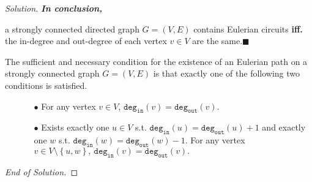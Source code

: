 \documentclass{article}
\renewcommand{\qedsymbol}{\hfill $\blacksquare$\par}
\newenvironment{solution}{\begin{proof}[\noindent\it Solution]}{\end{proof}}
\begin{document}
\begin{solution}
    \vspace{2em}\hspace{-2em}
    \textbf{\textit{In conclusion,}}
    
    \hspace{0.6em}
    a strongly connected directed graph $G=(V,E)$ contains Eulerian circuits \textbf{iff.} the in-degree and out-degree of each vertex $v\in V$ are the same.\qedsymbol
    
    \vspace{3em} \hspace{0.5em}
    The sufficient and necessary condition for the existence of an Eulerian path on a strongly connected graph $G=(V,E)$ is that exactly one of the following two conditions is satisfied.

    \vspace{-0.5em}
    \begin{itemize}
        \item[] \begin{itemize}
            \item[$\bullet$] For any vertex $v\in V$, $\mathtt{{deg}_{in}}(v)=\mathtt{deg_{out}}(v).$
            \item[$\bullet$] Exists exactly one $u\in V$ s.t. $\mathtt{deg_{in}}(u)=\mathtt{deg_{out}}(u)+1$ and exactly one $w$ s.t. $\mathtt{deg_{in}}(w)=\mathtt{deg_{out}}(w)-1$. For any vertex $v\in V\setminus\left\{u,w\right\},\ \mathtt{deg_{in}}(v)=\mathtt{deg_{out}}(v).$
        \end{itemize}
    \end{itemize}
    
    \hspace{33.9em}
    \textit{End of Solution.}
\end{solution}
\end{document}
